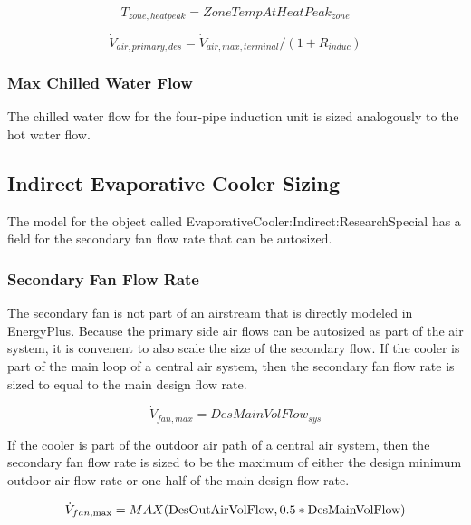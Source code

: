 \begin{equation}
{T_{zone,heatpeak}} = ZoneTempAtHeatPea{k_{zone}}
\end{equation}

\begin{equation}
{\dot V_{air,primary,des}} = {\dot V_{air,max,terminal}}/(1 + {R_{induc}})
\end{equation}

\subsubsection{Max Chilled Water Flow}\label{max-chilled-water-flow}

The chilled water flow for the four-pipe induction unit is sized analogously to the hot water flow.

\subsection{Indirect Evaporative Cooler Sizing}\label{indirect-evaporative-cooler-sizing}

The model for the object called EvaporativeCooler:Indirect:ResearchSpecial has a field for the secondary fan flow rate that can be autosized.

\subsubsection{Secondary Fan Flow Rate}\label{secondary-fan-flow-rate}

The secondary fan is not part of an airstream that is directly modeled in EnergyPlus. Because the primary side air flows can be autosized as part of the air system, it is convenent to also scale the size of the secondary flow. If the cooler is part of the main loop of a central air system, then the secondary fan flow rate is sized to equal to the main design flow rate.

\begin{equation}
\dot V_{fan,max} = DesMainVolFlow_{sys}
\end{equation}

If the cooler is part of the outdoor air path of a central air system, then the secondary fan flow rate is sized to be the maximum of either the design minimum outdoor air flow rate or one-half of the main design flow rate.

\begin{equation}
{\dot V_{fan,\max }} = MAX({\rm{DesOutAirVolFlow, 0}}{\rm{.5*DesMainVolFlow)}}
\end{equation}


